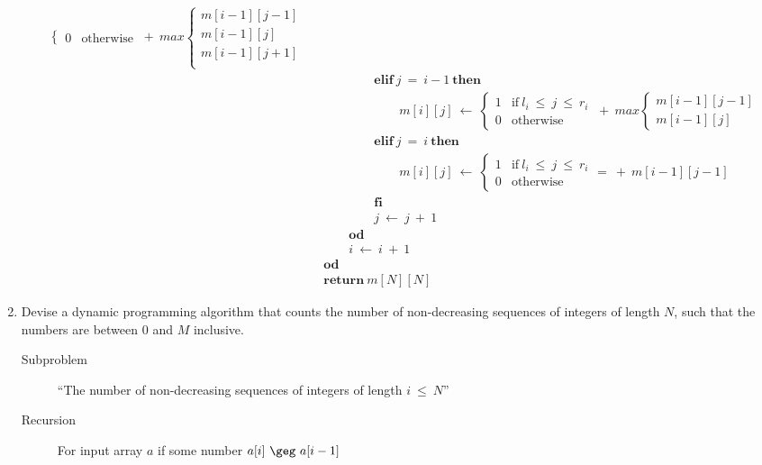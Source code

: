\documentclass[a4paper]{article}
\begin{document}
\begin{enumerate}
\begin{itemize}
\begin{align*}
\begin{cases}
																		0 & \text{otherwise}
																\end{cases}
																\ +\ \textit{max}
																\begin{cases}
																		m[i-1][j-1] & \\
																		m[i-1][j] & \\
																		m[i-1][j+1] & \\
																\end{cases}\\ 
																&\qquad\qquad\textbf{elif}\ j\ =\ i-1\ \textbf{then} \\
																&\qquad\qquad\qquad m[i][j]\ \gets\ 
																\begin{cases}
																		1 & \text{if}\ l_i\ \leq\ j\ \leq\ r_i \\
																		0 & \text{otherwise}
																\end{cases}
																\ +\ \textit{max}
																\begin{cases}
																		m[i-1][j-1] & \\
																		m[i-1][j] &  
																\end{cases}\\ 
																&\qquad\qquad\textbf{elif}\ j\ =\ i\ \textbf{then} \\
																&\qquad\qquad\qquad m[i][j]\ \gets\ 
																\begin{cases}
																		1 & \text{if}\ l_i\ \leq\ j\ \leq\ r_i \\
																		0 & \text{otherwise}
																\end{cases}
										=
																
																
																
																\ +\ m[i-1][j-1] \\
																&\qquad\qquad\textbf{fi} \\
																&\qquad\qquad j\ \gets\ j\ +\ 1 \\
																&\qquad\textbf{od} \\
																&\qquad i\ \gets\ i\ +\ 1 \\
																&\textbf{od} \\
																&\textbf{return}\ m[N][N]
														\end{align*}
						\end{itemize}

				\item Devise a dynamic programming algorithm that counts the number of non-decreasing sequences of integers of length $N$, such that the numbers are between $0$ and $M$ inclusive.
						\begin{description}
								\item[Subproblem] ``The number of non-decreasing sequences of integers of length $i\ \leq\ N$''
								\item[Recursion] For input array $a$ if some number $a[i]\ \geg\ a[i-1]$ 


\end{description}
\end{enumerate}
\end{document}

